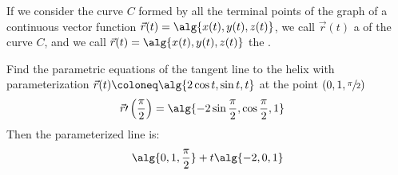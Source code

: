 \documentclass[12pt]{report}
\begin{document}
If we consider the curve $C$ formed by all the terminal points of the graph of a continuous vector function $\vec{r}(t) = \alg{x(t), y(t), z(t)}$, we call $\vec{r}(t)$ a  of the curve $C$, and we call $\vec{r}(t) = \alg{x(t), y(t), z(t)}$ the .

\begin{exbox}{}{}
    Find the parametric equations of the tangent line to the helix with parameterization $\vec{r}(t) \coloneq \alg{2 \cos t, \sin t, t}$ at the point $(0,1,\sfrac{\pi}{2})$
    \tcblower
    \begin{align*}
        \vec{r}\prime \left( \frac{\pi}{2} \right)
        &= \alg{-2 \sin \frac{\pi}{2}, \cos \frac{\pi}{2}, 1}
    \end{align*}
    Then the parameterized line is:
    \[ \alg{0,1,\frac{\pi}{2}} + t\alg{-2,0,1} \]
\end{exbox}

\amzindex
\end{document}
